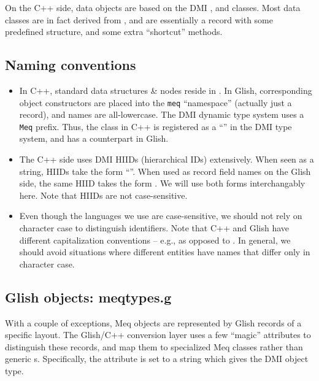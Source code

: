 \documentclass[10pt]{article}
\begin{document}
  On the C++ side, data objects are based on the DMI ,
   and  classes. Most data classes are in fact
  derived from , and are essentially a record with some
  predefined structure, and some extra ``shortcut'' methods. 

\subsection{Naming conventions}

  \begin{itemize}

  \item In C++, standard data structures \& nodes reside in .
    In Glish, corresponding object constructors are placed into the {\tt meq}
    ``namespace'' (actually just a record), and names are all-lowercase. The DMI dynamic type system
    uses a {\tt Meq} prefix. Thus, the  class in C++ is
    registered as a ``'' in the DMI type system, and  has a 
     counterpart in Glish.

  \item The C++ side uses DMI HIIDs (hierarchical IDs) extensively. When seen
    as a string, HIIDs take the form ``''. When used as record
    field names on the Glish side, the same HIID takes the form
    . We will use both forms interchangably here. Note that
    HIIDs are not case-sensitive.
    
  \item Even though the languages we use are case-sensitive, we should not rely
    on character case to distinguish identifiers. Note that C++ and Glish have
    different capitalization conventions -- e.g.,  as opposed
    to . In general, we should avoid situations where different
    entities have names that differ only in character case.

  \end{itemize}

\subsection{Glish  objects: meqtypes.g}

  With a couple of exceptions, Meq objects are represented by Glish records of
  a specific layout. The Glish/C++ conversion layer uses a few ``magic''
  attributes to distinguish these records, and map them to specialized Meq
  classes rather than generic s. Specifically, the
   attribute is set to a string which gives the DMI
  object type. 
\end{document}
